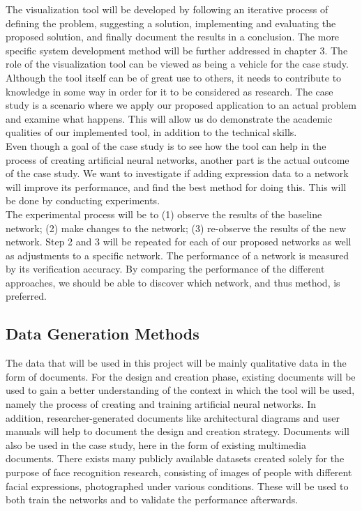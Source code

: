 \noindent The visualization tool will be developed by following an iterative process of defining the problem, suggesting a solution, implementing and evaluating the proposed solution, and finally document the results in a conclusion. The more specific system development method will be further addressed in chapter 3. The role of the visualization tool can be viewed as being a vehicle for the case study. Although the tool itself can be of great use to others, it needs to contribute to knowledge in some way in order for it to be considered as research. The case study is a scenario where we apply our proposed application to an actual problem and examine what happens. This will allow us do demonstrate the academic qualities of our implemented tool, in addition to the technical skills. \\

\noindent Even though a goal of the case study is to see how the tool can help in the process of creating artificial neural networks, another part is the actual outcome of the case study. We want to investigate if adding expression data to a network will improve its performance, and find the best method for doing this. This will be done by conducting experiments. \\

\noindent The experimental process will be to (1) observe the results of the baseline network; (2) make changes to the network; (3) re-observe the results of the new network. Step 2 and 3 will be repeated for each of our proposed networks as well as adjustments to a specific network. The performance of a network is measured by its verification accuracy. By comparing the performance of the different approaches, we should be able to discover which network, and thus method, is preferred.

\subsection{Data Generation Methods}

The data that will be used in this project will be mainly qualitative data in the form of documents. For the design and creation phase, existing documents will be used to gain a better understanding of the context in which the tool will be used, namely the process of creating and training artificial neural networks. In addition, researcher-generated documents like architectural diagrams and user manuals will help to document the design and creation strategy. Documents will also be used in the case study, here in the form of existing multimedia documents. There exists many publicly available datasets created solely for the purpose of face recognition research, consisting of images of people with different facial expressions, photographed under various conditions. These will be used to both train the networks and to validate the performance afterwards.

